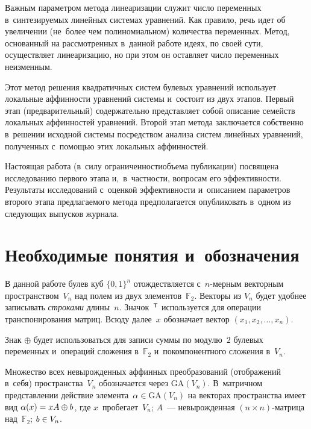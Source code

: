 \begin{multicols}{2}
Важным параметром метода линеаризации служит число переменных в~синтезируемых 
линейных системах уравнений. Как правило, речь идет об увеличении (не~более чем 
полиномиальном) количества переменных.
Метод, основанный на рассмотренных в~данной работе идеях, по своей сути, 
осуществляет линеаризацию, но при этом он остав\-ля\-ет число переменных неизменным.

Этот метод решения квадратичных систем булевых уравнений использует локальные 
аффинности уравнений системы и~состоит из двух этапов.
Первый этап (предварительный) содержательно представляет собой описание семейств 
локальных аффинностей уравнений.
Второй этап метода заклю\-ча\-ет\-ся собственно в~решении исходной сис\-те\-мы посредством 
анализа сис\-тем линейных уравнений, полученных с~помощью этих локальных 
аффинностей.

Настоящая работа (в~силу ограниченности\linebreak объема публикации) посвящена 
исследованию первого этапа и,~в~частности, вопросам его эффективности. 
Результаты исследований с~оценкой эф\-фек\-тив\-ности и~описанием параметров второго
\mbox{этапа} предлагаемого метода предполагается опуб\-ли\-ко\-вать в~одном из сле\-ду\-ющих 
выпусков журнала.

\vspace*{-4pt}

\section{Необходимые понятия и~обозначения}

В данной работе булев куб $\{0,1\}^n$ отождествляется с~$n$-мерным векторным 
пространством~$V_n$ над полем из двух элементов~$\mathbb{F}_2$.
Векторы из $V_n$ будет удобнее записывать \textit{строками} длины~$n$. Значок~$^{\mathsf T}$ 
используется для операции транспонирования матриц.
Всюду далее~$x$ обозначает вектор $(x_1,x_2,\ldots,x_n)$.

Знак $\oplus$ будет использоваться для записи суммы по модулю~$2$ булевых 
переменных и~операций сложения в~$\mathbb{F}_2$ и~покомпонентного сложения 
в~$V_n$.

Множество всех невырожденных аффинных преобразований (отображений в~себя) 
пространства~$V_n$ обозначается через $\mathrm{GA}(V_n)$. В~матричном 
представлении действие элемента~$\alpha\in\mathrm{GA}(V_n)$ на векторах 
пространства имеет вид $\alpha(x)\hm=xA\oplus b$, где $x$~пробегает~$V_n$; $A$~--- 
невырожденная $(n\times n)$-мат\-ри\-ца над~$\mathbb{F}_2$; $b\hm\in V_n$.


\end{multicols}
